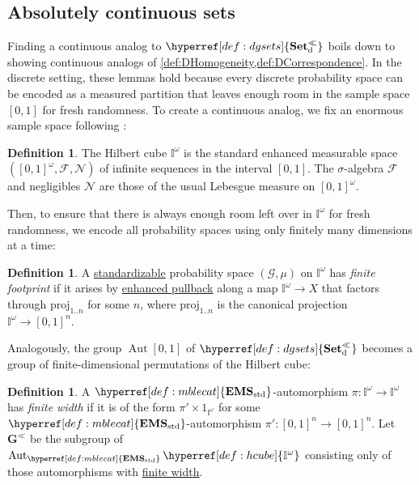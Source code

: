 \documentclass[
  sigconf,
  screen, ]{acmart}
\makeatletter
\theoremstyle{definition}
\newtheorem{definition}[theorem]{Definition}
\newcommand\Aut{\operatorname{Aut}}
\newcommand\calF{\mathcal F}
\newcommand\calG{\mathcal G}
\newcommand\calN{\mathcal N}
\newcommand{\labelword}[2]{\phantomsection
  #1\def\@currentlabel{\unexpanded{#1}}\label{#2}}
\newcommand\nref[2]{\hyperref[#1]{#2}} \newcommand\checkhigh{{\huge{\color{red}\textbf{TODO: check}}}}
\newcommand\texhcube{{{{\mathbb I}^\omega}}}
\newcommand\hcube{{\nref{def:hcube}{\texhcube}}}
\newcommand\texAgoodname{Absolutely continuous set}
\newcommand\Agoodnamenolink{\texAgoodname}
\newcommand\agoodnamecat{\mathbf{Set}^\ll}
\newcommand\texStdMble{\mathbf{EMS}_{\rm std}}
\newcommand\StdMble{{\nref{def:mblecat}{\texStdMble}}}
\newcommand\dauti{\nref{def:dauti}{\Aut[0,1]}}
\newcommand\discsubscript{_{\rm d}}
\newcommand\dgsets{{\nref{def:dgsets}{\agoodnamecat\discsubscript}}}
\newcommand\texauti{\mathbf{G}^{\ll}}
\newcommand\auti{{\nref{def:auti}{\texauti}}}
\makeatother
\begin{document}
\subsection{\Agoodnamenolink{s}} \label{sec:pnom}

Finding a continuous analog to $\dgsets$ boils down
to showing continuous analogs of \cref{def:DHomogeneity,def:DCorrespondence}.
In the discrete setting, these lemmas hold
because every discrete probability space
can be encoded as a measured partition that leaves
enough room in the sample space $[0,1]$ for fresh randomness.
To create a continuous analog,
we fix an enormous sample space following \citet{li2023lilac}:

\newcommand\hcubeproj[1]{{\nref{def:projn}{\mathrm{proj}_{1..#1}}}}
\newcommand\embedmap[1]{{#1\nref{def:embedmap}{\otimes1_\hcube}}}

\begin{definition} \label{def:hcube}
  The Hilbert cube $\hcube$ is the standard enhanced measurable space $([0,1]^\omega,\calF,\calN)$
  of infinite sequences in the interval $[0,1]$.
  The $\sigma$-algebra $\calF$
  and negligibles $\calN$ are those of the usual Lebesgue measure
  on $[0,1]^\omega$.
\end{definition}

Then, to ensure that there is always enough room left over in $\hcube$ for 
fresh randomness, we encode all probability spaces 
using only finitely many dimensions at a time:

\begin{definition} \label{def:ff-pspc}
  A \nref{def:standardizable}{standardizable} probability space $(\calG,\mu)$ on $\hcube$
  has \emph{finite footprint}
  if it arises by \nref{def:epb}{enhanced pullback} along a
  map $\hcube\to X$ that factors through 
  $\hcubeproj n$ for some $n$,
  \labelword{where}{def:projn}
  $\hcubeproj n$ is the canonical projection $\hcube\to[0,1]^n$.
\end{definition}

Analogously, the group $\dauti$ of $\dgsets$
becomes a group of finite-dimensional permutations of the Hilbert cube:

\begin{definition} \label{def:autoff}
\label{def:auti}
  A $\StdMble$-automorphism $\pi : \hcube\to\hcube$
  has \emph{finite width}
  if it is of the form $\pi'\times 1_{\hcube}$
  for some $\StdMble$-automorphism
  $\pi' : [0,1]^n\to[0,1]^n$.
  Let $\auti$ be the subgroup of $\Aut_\StdMble\hcube$
  consisting only of those automorphisms with \nref{def:autoff}{finite width}.
\end{definition}
\end{document}
